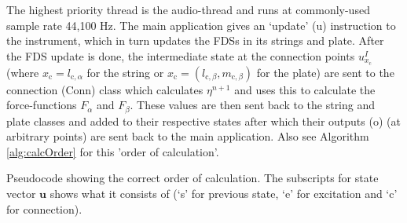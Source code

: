 \documentclass{article}
\begin{document}
The highest priority thread is the audio-thread and runs at commonly-used sample rate 44,100 Hz. The main application gives an `update' (u) instruction to the instrument, which in turn updates the FDSs in its strings and plate. After the FDS update is done, the intermediate state at the connection points $u^I_{x_\text{c}}$ (where $x_\text{c} = l_{\text{c},\alpha}$ for the string or $x_\text{c} = (l_{\text{c},\beta}, m_{\text{c},\beta})$ for the plate) are sent to the connection (Conn) class which calculates $\eta^{n+1}$ and uses this to calculate the force-functions $F_\alpha$ and $F_\beta$. These values are then sent back to the string and plate classes and added to their respective states after which their outputs (o) (at arbitrary points) are sent back to the main application. Also see Algorithm \ref{alg:calcOrder} for this 'order of calculation'.
\begin{algorithm}[h]\label{alg:calcOrder}
 \caption{Pseudocode showing the correct order of calculation. The subscripts for state vector $\mathbf{u}$ shows what it consists of (`s' for previous state, `e' for excitation and `c' for connection).}
\end{algorithm}
\end{document}
